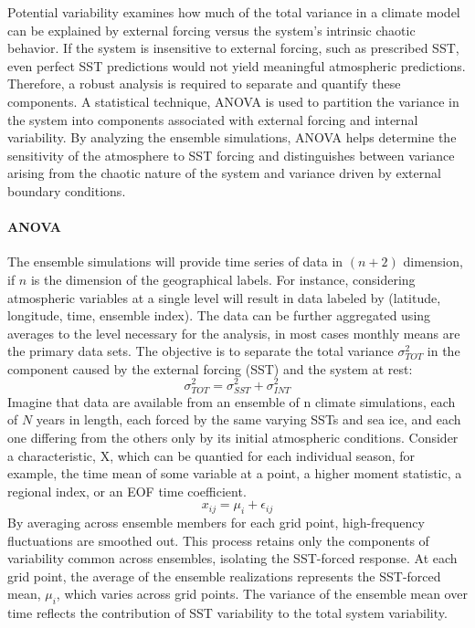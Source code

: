 Potential variability examines how much of the total variance in a climate model can be explained by external forcing versus the system's intrinsic chaotic behavior. If the system is insensitive to external forcing, such as prescribed SST, even perfect SST predictions would not yield meaningful atmospheric predictions. Therefore, a robust analysis is required to separate and quantify these components. A statistical technique, ANOVA is used to partition the variance in the system into components associated with external forcing and internal variability. By analyzing the ensemble simulations, ANOVA helps determine the sensitivity of the atmosphere to SST forcing and distinguishes between variance arising from the chaotic nature of the system and variance driven by external boundary conditions.
\paragraph{ANOVA} The ensemble simulations will provide time series of data in $(n+2)$ dimension, if $n$ is
the dimension of the geographical labels. For instance, considering atmospheric variables at a single level will result in data labeled by (latitude, longitude, time, ensemble index). The data can be further aggregated using averages to the level necessary for the analysis, in most cases monthly means are the primary data sets. The objective is to separate the total variance $\sigma^2_{TOT}$ in the component caused by the external forcing (SST) and the system at rest:
$$\sigma_{TOT}^2=\sigma^2_{SST}+\sigma^2_{INT}$$
Imagine that data are available from an ensemble of n climate
simulations, each of $N$ years in length, each forced by the same
varying SSTs and sea ice, and each one differing from the others only
by its initial atmospheric conditions. Consider a characteristic, X, which can be quantied for each individual season, for example, the time mean of some variable at a point, a higher moment statistic, a regional index, or an EOF time coefficient.
$$x_{ij}=\mu_i+\epsilon_{ij}$$
By averaging across ensemble members for each grid point, high-frequency fluctuations are smoothed out. This process retains only the components of variability common across ensembles, isolating the SST-forced response. At each grid point, the average of the ensemble realizations represents the SST-forced mean, $\mu_i$, which varies across grid points. The variance of the ensemble mean over time reflects the contribution of SST variability to the total system variability.

